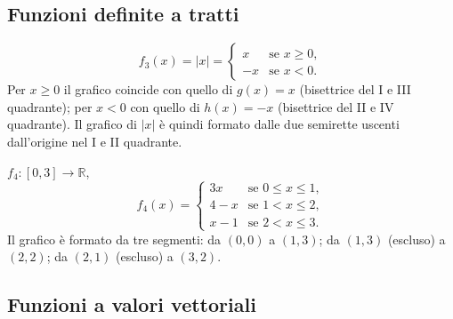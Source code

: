 \documentclass[11pt,a4paper]{article}
\begin{document}
\subsection{Funzioni definite a tratti}

\begin{esempio}
\[
f_3(x) = |x| = \begin{cases} x & \text{se } x \geq 0, \\ -x & \text{se } x < 0. \end{cases}
\]
Per $x \geq 0$ il grafico coincide con quello di $g(x) = x$ (bisettrice del I e III quadrante); per $x < 0$ con quello di $h(x) = -x$ (bisettrice del II e IV quadrante). Il grafico di $|x|$ è quindi formato dalle due semirette uscenti dall'origine nel I e II quadrante.
\end{esempio}

\begin{esempio}
$f_4 : [0, 3] \to \mathbb{R}$,
\[
f_4(x) = \begin{cases}
3x & \text{se } 0 \leq x \leq 1, \\
4 - x & \text{se } 1 < x \leq 2, \\
x - 1 & \text{se } 2 < x \leq 3.
\end{cases}
\]
Il grafico è formato da tre segmenti: da $(0, 0)$ a $(1, 3)$; da $(1, 3)$ (escluso) a $(2, 2)$; da $(2, 1)$ (escluso) a $(3, 2)$.
\end{esempio}

\begin{center}
\end{center}

\subsection{Funzioni a valori vettoriali}
\end{document}
